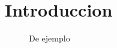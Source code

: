\section{Introduccion}
\lipsum[1-2]
\begin{figure}[H]
    \centering
    \caption{De ejemplo}
    \label{fig:De ejemplo}
\end{figure}
